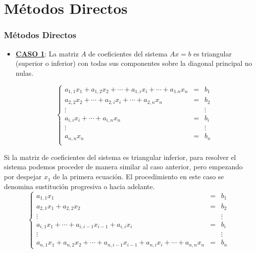 \documentclass{beamer}
\begin{document}
\section{M\'etodos Directos}
\begin{frame}
  \frametitle{M\'etodos Directos}
  \begin{itemize}
    \item \underline{\textbf{CASO 1}}: La matriz $A$ de coeficientes del sistema $Ax = b$ es triangular (superior o inferior) con
    todas sus componentes sobre la diagonal principal no nulas.
    
    $$
    \left\{\begin{array}{rcc}
            a_{1,1}x_1 + a_{1,2}x_2 + \cdots + a_{1,i}x_i + \cdots + a_{1.n}x_n & = & b_1\\
             a_{2,2}x_2 + \cdots + a_{2,i}x_i + \cdots + a_{2,n}x_n & = & b_2\\
              \vdots & & \vdots\\
                 a_{i,i}x_i + \cdots + a_{i,n}x_n & = & b_i\\
                        \vdots & & \vdots\\
                     a_{n,n}x_n & = & b_n\\
           \end{array}\right.
    $$
  \end{itemize}
\end{frame}
\begin{frame}
  Si la matriz de coeficientes del sistema es triangular inferior, para resolver el sistema podemos proceder de manera similar al caso anterior, pero empezando por despejar $x_1$ de la primera ecuaci\'on. El procedimiento en este caso se denomina sustituci\'on progresiva o hacia adelante.
  $$
    \left\{\begin{array}{lcc}
            a_{1,1}x_1  & = & b_1\\
            a_{2,1}x_1 + a_{2,2}x_2 & = & b_2\\
              \vdots & & \vdots\\
            a_{i,1}x_1 + \cdots + a_{i,i-1}x_{i-1} + a_{i,i}x_i  & = & b_i\\
            \vdots & & \vdots\\
            a_{n,1}x_{1} + a_{n,2}x_2 + \cdots + a_{n,i-1}x_{i-1} + a_{n,i}x_i + \cdots + a_{n,n}x_n & = & b_{n}
           \end{array}\right.
    $$
\end{frame}
\end{document}
